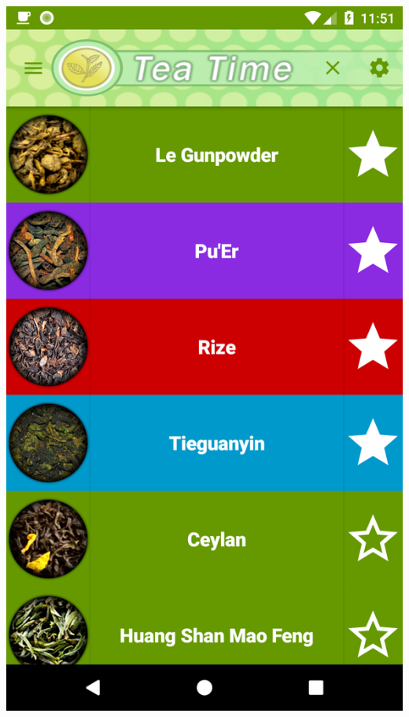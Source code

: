 \documentclass[a4paper,12pt]{article}
\begin{document}
\begin{spacing}{1}
	\includegraphics*[scale=0.1]{Screenshot/16.png}    

\end{spacing}
\end{document}
